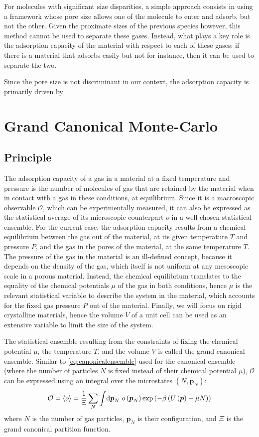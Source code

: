 \documentclass[main.tex]{subfiles}
\begin{document}
For molecules with significant size disparities, a simple approach consists in using a framework whose pore size allows one of the molecule to enter and adsorb, but not the other. Given the proximate sizes of the previous species however, this method cannot be used to separate these gases. Instead, what plays a key role is the adsorption capacity of the material with respect to each of these gases: if there is a material that adsorbs  easily but not  for instance, then it can be used to separate the two.

Since the pore size is not discriminant in our context, the adsorption capacity is primarily driven by

\section{Grand Canonical Monte-Carlo}
\label{GCMC}

\subsection{Principle}

The adsorption capacity of a gas in a material at a fixed temperature and pressure is the number of molecules of gas that are retained by the material when in contact with a gas in these conditions, at equilibrium. Since it is a macroscopic observable $\mathcal O$, which can be experimentally measured, it can also be expressed as the statistical average of its microscopic counterpart $o$ in a well-chosen statistical ensemble. For the current case, the adsorption capacity results from a chemical equilibrium between the gas out of the material, at its given temperature $T$ and pressure $P$, and the gas in the pores of the material, at the same temperature $T$. The pressure of the gas in the material is an ill-defined concept, because it depends on the density of the gas, which itself is not uniform at any mesoscopic scale in a porous material. Instead, the chemical equilibrium translates to the equality of the chemical potentials $\mu$ of the gas in both conditions, hence $\mu$ is the relevant statistical variable to describe the system in the material, which accounts for the fixed gas pressure $P$ out of the material. Finally, we will focus on rigid crystalline materials, hence the volume $V$ of a unit cell can be used as an extensive variable to limit the size of the system.

The statistical ensemble resulting from the constraints of fixing the chemical potential $\mu$, the temperature $T$, and the volume $V$ is called the grand canonical ensemble. Similar to \cref{eq:canonicalensemble} used for the canonical ensemble (where the number of particles $N$ is fixed instead of their chemical potential $\mu$), $\mathcal O$ can be expressed using an integral over the microstates $(N,\boldsymbol p_N)$:
\[\mathcal O = \left<o\right> = \frac1\Xi\sum_N\int\!\text d{\boldsymbol p_N}\  o\left({\boldsymbol p_N}\right)\exp\left(-\beta \left(U\left({\boldsymbol p}\right) - \mu N\right)\right)\label{eq:grandcanonicalensemble}\]
where $N$ is the number of gas particles, $\boldsymbol p_N$ is their configuration, and $\Xi$ is the grand canonical partition function.
\end{document}
